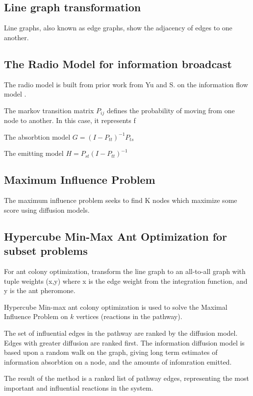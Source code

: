 \documentclass[twoside]{article}
\begin{document}
\begin{multicols}{2}
\subsection{Line graph transformation}

Line graphs, also known as edge graphs, show the adjacency of edges to
one another.

\subsection{The Radio Model for information broadcast}

The radio model is built from prior work from Yu and S.  on the
information flow model \cite{Stojmirovic:2007eg}.
 
The markov transition matrix $P_{ij}$ defines the probability of
moving from one node to another. In this case, it represents f

The absorbtion model $G = (I - P_{tt})^{-1} P_{ts}$

The emitting model $H = P_{st} (I - P_{tt})^{-1}$

\subsection{Maximum Influence Problem}

The maximum influence problem seeks to find K nodes which maximize
some score using diffusion models.

\subsection{Hypercube Min-Max Ant Optimization for subset problems}

For ant colony optimization, transform the line graph to an 
all-to-all graph with tuple
weights (x,y) where x is the edge weight from the integration
function, and y is the ant pheromone.

Hypercube Min-max ant colony optimization is used to solve the
Maximal Influence Problem on $k$ vertices (reactions in the pathway).

The set of influential edges in the pathway are ranked by the
diffusion model. Edges with greater diffusion are ranked first.
The information diffusion model is based upon a random walk on the
graph, giving long term estimates of information absorbtion on a node,
and the amounts of infomration emitted.

The result of the method is a ranked list of pathway edges,
representing the most important and influential reactions in the system.



\end{multicols}
\end{document}
